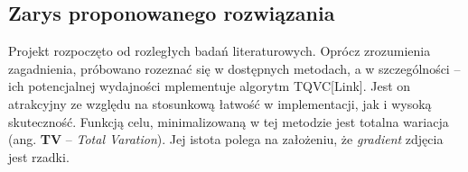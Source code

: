 \subsection{Zarys proponowanego rozwiązania}
Projekt rozpoczęto od rozległych badań literaturowych. Oprócz zrozumienia zagadnienia, próbowano rozeznać się w dostępnych metodach, a w szczególności – ich potencjalnej wydajności mplementuje algorytm TQVC[Link]. Jest on atrakcyjny ze względu na stosunkową łatwość w implementacji, jak i wysoką skuteczność. Funkcją celu, minimalizowaną w tej metodzie jest  totalna wariacja (ang. \textbf{TV} – \textit{Total Varation}). Jej istota polega na założeniu, że \textit{gradient} zdjęcia jest rzadki.